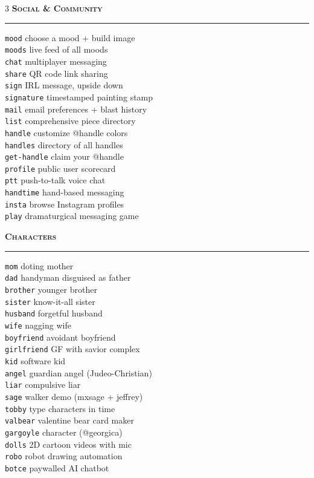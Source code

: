 \documentclass[10pt,letterpaper,twocolumn]{article}
\newcommand{\pe}[2]{\texttt{\color{acpurple}#1} #2}
\newcommand{\peh}[1]{\vspace{0.3em}\noindent\textbf{\textsc{#1}}\par\vspace{0.1em}\hrule\vspace{0.2em}}
\begin{document}
\begin{multicols}{3}
\peh{Social \& Community}
\pe{mood}{choose a mood + build image}\\
\pe{moods}{live feed of all moods}\\
\pe{chat}{multiplayer messaging}\\
\pe{share}{QR code link sharing}\\
\pe{sign}{IRL message, upside down}\\
\pe{signature}{timestamped painting stamp}\\
\pe{mail}{email preferences + blast history}\\
\pe{list}{comprehensive piece directory}\\
\pe{handle}{customize @handle colors}\\
\pe{handles}{directory of all handles}\\
\pe{get-handle}{claim your @handle}\\
\pe{profile}{public user scorecard}\\
\pe{ptt}{push-to-talk voice chat}\\
\pe{handtime}{hand-based messaging}\\
\pe{insta}{browse Instagram profiles}\\
\pe{play}{dramaturgical messaging game}

\peh{Characters}
\pe{mom}{doting mother}\\
\pe{dad}{handyman disguised as father}\\
\pe{brother}{younger brother}\\
\pe{sister}{know-it-all sister}\\
\pe{husband}{forgetful husband}\\
\pe{wife}{nagging wife}\\
\pe{boyfriend}{avoidant boyfriend}\\
\pe{girlfriend}{GF with savior complex}\\
\pe{kid}{software kid}\\
\pe{angel}{guardian angel (Judeo-Christian)}\\
\pe{liar}{compulsive liar}\\
\pe{sage}{walker demo (mxsage + jeffrey)}\\
\pe{tobby}{type characters in time}\\
\pe{valbear}{valentine bear card maker}\\
\pe{gargoyle}{character (@georgica)}\\
\pe{dolls}{2D cartoon videos with mic}\\
\pe{robo}{robot drawing automation}\\
\pe{botce}{paywalled AI chatbot}


\end{multicols}
\end{document}
